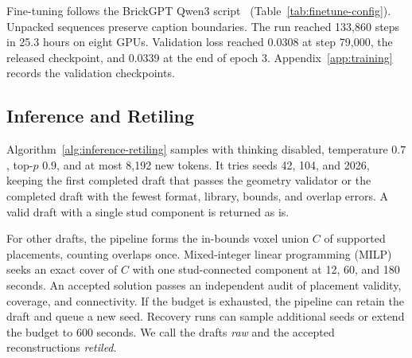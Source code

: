 Fine-tuning follows the BrickGPT Qwen3 script~\cite{brickgpt} (Table~\ref{tab:finetune-config}). Unpacked sequences preserve caption boundaries. The run reached 133,860 steps in 25.3 hours on eight GPUs. Validation loss reached 0.0308 at step 79,000, the released checkpoint, and 0.0339 at the end of epoch 3. Appendix~\ref{app:training} records the validation checkpoints.


\subsection{Inference and Retiling}
Algorithm~\ref{alg:inference-retiling} samples with thinking disabled, temperature $0.7$, top-$p$ $0.9$, and at most 8,192 new tokens. It tries seeds 42, 104, and 2026, keeping the first completed draft that passes the geometry validator or the completed draft with the fewest format, library, bounds, and overlap errors. A valid draft with a single stud component is returned as is.

For other drafts, the pipeline forms the in-bounds voxel union $C$ of supported placements, counting overlaps once. Mixed-integer linear programming (MILP) seeks an exact cover of $C$ with one stud-connected component at 12, 60, and 180 seconds. An accepted solution passes an independent audit of placement validity, coverage, and connectivity. If the budget is exhausted, the pipeline can retain the draft and queue a new seed. Recovery runs can sample additional seeds or extend the budget to 600 seconds. We call the drafts \emph{raw} and the accepted reconstructions \emph{retiled}.

